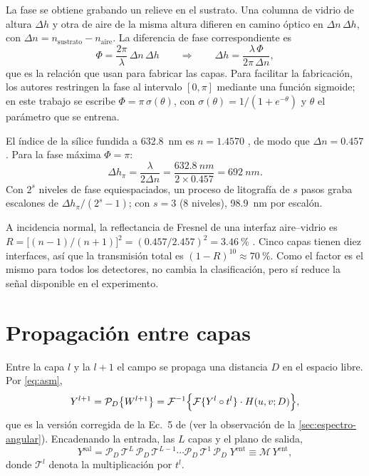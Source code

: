 La fase se obtiene grabando un relieve en el sustrato. Una columna de vidrio de altura
$\Delta h$ y otra de aire de la misma altura difieren en camino óptico en $\Delta n\,\Delta h$, con
$\Delta n=n_{\text{sustrato}}-n_{\text{aire}}$. La diferencia de fase correspondiente es
\begin{equation}
  \Phi=\frac{2\pi}{\lambda}\,\Delta n\,\Delta h
  \qquad\Longrightarrow\qquad
  \Delta h=\frac{\lambda\,\Phi}{2\pi\,\Delta n},
  \label{eq:altura}
\end{equation}
que es la relación que usan \textcite{chen2021} para fabricar las capas. Para facilitar la
fabricación, los autores restringen la fase al intervalo $[0,\pi]$ mediante una función
sigmoide; en este trabajo se escribe $\Phi=\pi\,\sigma(\theta)$, con
$\sigma(\theta)=1/(1+e^{-\theta})$ y $\theta$ el parámetro que se entrena.

\begin{calculo}
El índice de la sílice fundida a \SI{632.8}{nm} es $n=1.4570$ \parencite{malitson1965}, de modo
que $\Delta n=0.457$. Para la fase máxima $\Phi=\pi$:
\[
  \Delta h_{\pi}=\frac{\lambda}{2\Delta n}=\frac{\SI{632.8}{nm}}{2\times0.457}=\SI{692}{nm}.
\]
Con $2^s$ niveles de fase equiespaciados, un proceso de litografía de $s$ pasos graba
escalones de $\Delta h_\pi/(2^s-1)$; con $s=3$ (8 niveles), \SI{98.9}{nm} por escalón.
\end{calculo}

\begin{calculo}
A incidencia normal, la reflectancia de Fresnel de una interfaz aire--vidrio es
$R=\bigl[(n-1)/(n+1)\bigr]^2=(0.457/2.457)^2=\SI{3.46}{\percent}$
\parencite[sec.~4.6]{hecht2017}. Cinco capas tienen diez interfaces, así que la
transmisión total es $(1-R)^{10}\approx\SI{70}{\percent}$. Como el factor es el mismo para todos
los detectores, no cambia la clasificación, pero sí reduce la señal disponible en el
experimento.
\end{calculo}

\section{Propagación entre capas}\label{sec:propagacion}

Entre la capa $l$ y la $l+1$ el campo se propaga una distancia $D$ en el espacio libre. Por
\eqref{eq:asm},
\begin{equation}
  Y^{l+1}=\mathcal{P}_D\bigl\{W^{l+1}\bigr\}
         =\mathcal{F}^{-1}\Bigl\{\mathcal{F}\{Y^l\circ t^l\}\cdot H(u,v;D)\Bigr\},
  \label{eq:capa-a-capa}
\end{equation}
que es la versión corregida de la Ec.~5 de \textcite{chen2021} (ver la observación de la
\cref{sec:espectro-angular}). Encadenando la entrada, las $L$ capas y el plano de salida,
\begin{equation}
  Y^{\text{sal}}=\mathcal{P}_D\,\mathcal{T}^{L}\,\mathcal{P}_D\,\mathcal{T}^{L-1}\cdots
                 \mathcal{P}_D\,\mathcal{T}^{1}\,\mathcal{P}_D\;Y^{\text{ent}}
               \equiv\mathcal{M}\,Y^{\text{ent}},
  \label{eq:cadena}
\end{equation}
donde $\mathcal{T}^l$ denota la multiplicación por $t^l$.

